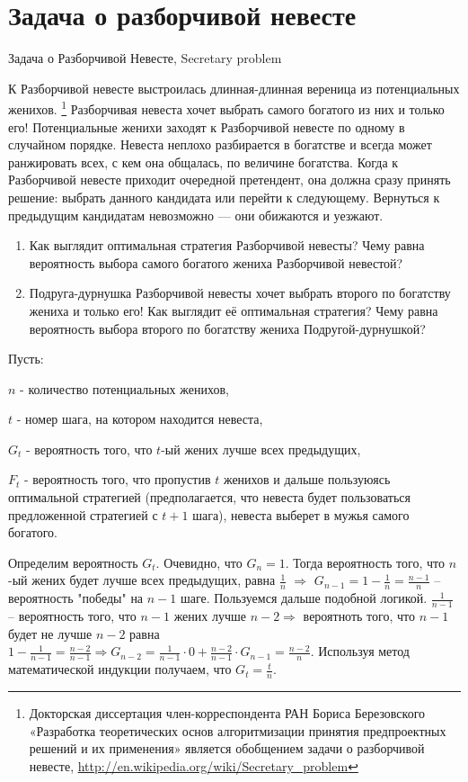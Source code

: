 \documentclass[12pt]{article}
\newcounter{problem}[section]
\newenvironment{problem}%
{%
\refstepcounter{problem}%
     \hypertarget{problem:{\thesection.\theproblem}}{} %
     \Writetofile{solution_file}{\protect\hypertarget{soln:\thesection.\theproblem}{}}
     \begin{myenum}[label=\bfseries\protect\hyperlink{soln:\thesection.\theproblem}{\thesection.\theproblem},ref=\thesection.\theproblem]
     \item%
    }%
    {%
    \end{myenum}}
\begin{document}
\section{Задача о разборчивой невесте}

\begin{problem}
Задача о Разборчивой Невесте, Secretary problem

К Разборчивой невесте выстроилась длинная-длинная вереница из потенциальных женихов.
\footnote{Докторская диссертация член-корреспондента РАН Бориса Березовского
«Разработка теоретических основ алгоритмизации принятия предпроектных решений и их применения»
является обобщением задачи о разборчивой невесте, \url{http://en.wikipedia.org/wiki/Secretary_problem}}
Разборчивая невеста хочет выбрать самого богатого из них и только его!
Потенциальные женихи заходят к Разборчивой невесте по одному в случайном порядке.
Невеста неплохо разбирается в богатстве и всегда может ранжировать всех, с кем она общалась,
по величине богатства. Когда к Разборчивой невесте приходит очередной претендент,
она должна сразу принять решение: выбрать данного кандидата или перейти к следующему.
Вернуться к предыдущим кандидатам невозможно — они обижаются и уезжают.

\begin{enumerate}
\item Как выглядит оптимальная стратегия Разборчивой невесты? Чему равна вероятность выбора самого богатого жениха Разборчивой невестой?
\item Подруга-дурнушка Разборчивой невесты хочет выбрать второго по богатству жениха и только его!
Как выглядит её оптимальная стратегия?
Чему равна вероятность выбора второго по богатству жениха Подругой-дурнушкой?
\end{enumerate}

\begin{sol}
Пусть:

$n$ - количество потенциальных женихов,

$t$ - номер шага, на котором находится невеста,

$G_t$ - вероятность того, что $t$-ый жених лучше всех предыдущих,

$F_t$ - вероятность того, что пропустив $t$ женихов и дальше пользуюясь оптимальной
стратегией (предполагается, что невеста будет пользоваться предложенной стратегией с $t+1$
шага), невеста выберет в мужья самого богатого.

Определим вероятность $G_t$. Очевидно, что $G_n = 1$. Тогда вероятность того, что $n$-ый жених будет лучше всех предыдущих, равна  $\frac{1}{n}$ $\Rightarrow$ $G_{n-1}=1-\frac{1}{n}=\frac{n-1}{n}$ – вероятность "победы" на $n-1$ шаге. Пользуемся дальше подобной логикой. $\frac{1}{n-1}$ – вероятность того, что $n-1$ жених лучше $n-2\Rightarrow$ вероятноть того, что $n-1$ будет не лучше $n-2$ равна $1-\frac{1}{n-1}=\frac{n-2}{n-1}\Rightarrow G_{n-2}= \frac{1}{n-1}\cdot 0+\frac{n-2}{n-1}\cdot G_{n-1}=\frac{n-2}{n}$. Используя метод математической индукции получаем, что $G_t=\frac{t}{n}$.


\end{sol}
\end{problem}
\end{document}

